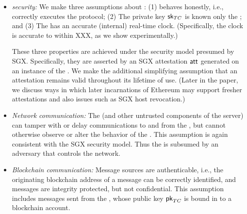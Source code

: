 \begin{itemize}
\item {\em \encname security:} We make three assumptions about \encname : (1) \encname behaves honestly, i.e., correctly executes the \tc protocol; (2) The private key ${{\sf sk}_{TC}}$ is known only the \encname; and (3) The \encname has an accurate (internal) real-time clock. (Specifically, the clock is accurate to within XXX, as we show experimentally.)

These three properties are achieved under the security model presumed by SGX. Specifically, they are asserted by an SGX attestation ${\sf att}$ generated on an instance of the \encname. We make the additional simplifying assumption that an attestation remains valid throughout its lifetime of use. (Later in the paper, we discuss ways in which later incarnations of Ethereum may support fresher attestations and also issues such as SGX host revocation.)

\item {\em Network communication:} The \medname (and other untrusted components of the \tc server) can tamper with or delay communications to and from the \encname, but cannot otherwise observe or alter the behavior of the \encname. This assumption is again consistent with the SGX security model. Thus the \medname is subsumed by an adversary that controls the network. 

\item {\em Blockchain communication:} Message sources are authenticable, i.e., the originating blockchain address of a message can be correctly identified, and messages are integrity protected, but not confidential. This assumption includes messages sent from the \encname, whose public key ${\sf pk}_{TC}$ is bound in \tc to a blockchain account. 
\end{itemize}












